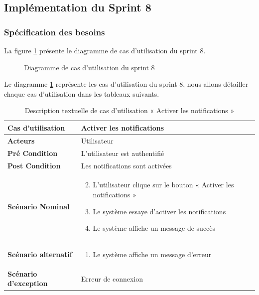 \subsection{Implémentation du Sprint 8}

\subsubsection{Spécification des besoins}
La figure \ref{fig:UseCaseDiagramSp81} présente le diagramme de cas d'utilisation du sprint 8.

\begin{figure}[H]
  \centering
  \caption{Diagramme de cas d'utilisation du sprint 8}
  \label{fig:UseCaseDiagramSp81}
\end{figure}

Le diagramme \ref{fig:UseCaseDiagramSp81} représente les cas d'utilisation du sprint 8, nous allons détailler chaque cas d'utilisation dans les tableaux suivants.


\begin{longtable}{|p{5cm}|p{10cm}|}
  \caption{Description textuelle de cas d'utilisation « Activer les notifications »} \label{tab:use_case_activer_notifications} \\
\hline
\textbf{Cas d'utilisation}&Activer les notifications\\
\hline
\textbf{Acteurs}&Utilisateur\\
\hline
\textbf{Pré Condition}&L'utilisateur est authentifié\\
\hline
\textbf{Post Condition}&Les notifications sont activées\\
\hline
\textbf{Scénario Nominal}&
\vspace{-\baselineskip}
\begin{enumerate}
  \setcounter{enumi}{1}
      \item L'utilisateur clique sur le bouton « Activer les notifications »
      \item Le système essaye d'activer les notifications
      \item Le système affiche un message de succès
\end{enumerate}\\
\hline
\textbf{Scénario alternatif}&
\vspace{-\baselineskip}
\begin{enumerate}
      \item [3.1] Le système affiche un message d'erreur
\end{enumerate}\\
\hline
\textbf{Scénario d'exception}&Erreur de connexion\\
\hline

\end{longtable}


